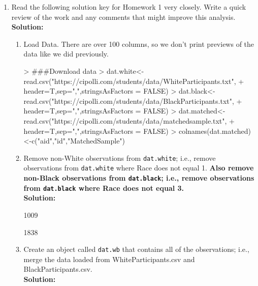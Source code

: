 \documentclass{article}
\begin{document}
\begin{enumerate}
\item Read the following solution key for Homework 1 very closely. Write a quick
review of the work and any comments that might improve this analysis.\\
\textbf{Solution:}

\begin{enumerate}
\item Load Data. There are over 100 columns, so we don't print previews of the data
like we did previously.
\begin{Schunk}
\begin{Sinput}
> ###Download data
> dat.white<-read.csv("https://cipolli.com/students/data/WhiteParticipants.txt",
+ header=T,sep=",",stringsAsFactors = FALSE)
> dat.black<-read.csv("https://cipolli.com/students/data/BlackParticipants.txt",
+ header=T,sep=",",stringsAsFactors = FALSE)
> dat.matched<-read.csv("https://cipolli.com/students/data/matchedsample.txt",
+ header=T,sep=",",stringsAsFactors = FALSE)
> colnames(dat.matched)<-c("aid","id","MatchedSample")
\end{Sinput}
\end{Schunk}
\item Remove non-White observations from \texttt{dat.white}; i.e., remove observations 
from \texttt{dat.white} where Race does not equal 1. \textbf{Also remove non-Black observations
from \texttt{dat.black}; i.e., remove observations 
from \texttt{dat.black} where Race does not equal 3.}\\
\textbf{Solution:}
\begin{Schunk}
\begin{Soutput}
[1] 1009
\end{Soutput}
\begin{Soutput}
[1] 1838
\end{Soutput}
\end{Schunk}
\item Create an object called \texttt{dat.wb} that contains all of the observations;
i.e., merge the data loaded from WhiteParticipants.csv and BlackParticipants.csv.\\
\textbf{Solution:}
\begin{Schunk}

\end{Schunk}
\end{enumerate}
\end{enumerate}
\end{document}
